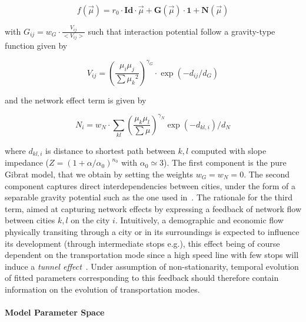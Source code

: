 \documentclass[Royal,sageh,times]{sagej}
\begin{document}
\begin{equation}
f(\vec{\mu}) = r_0\cdot \mathbf{Id}\cdot \vec{\mu} + \mathbf{G}\left(\vec{\mu}\right)\cdot \mathbf{1} + \mathbf{N}\left(\vec{\mu}\right)
\end{equation}


with $G_{ij} = w_G\cdot \frac{V_{ij}}{<V_{ij}>}$ such that interaction potential follow a gravity-type function given by 

\begin{equation}
V_{ij} = \left(\frac{\mu_i\mu_j}{\sum{\mu_k}^2}\right)^{\gamma_G}\cdot \exp{(-d_{ij}/d_G)}
\end{equation}

and the network effect term is given by


\begin{equation}
N_{i} = w_N \cdot \sum_{kl} \left(\frac{\mu_k\mu_l}{\sum\mu}\right)^{\gamma_N}\exp{(-d_{kl,i})/d_N}
\end{equation}

where $d_{kl,i}$ is distance to shortest path between $k,l$ computed with slope impedance ($Z=\left(1+\alpha/\alpha_0\right)^{n_0}$ with $\alpha_0\simeq 3$). The first component is the pure Gibrat model, that we obtain by setting the weights $w_G = w_N = 0$. The second component captures direct interdependencies between cities, under the form of a separable gravity potential such as the one used in~\cite{sanders1992systeme}. The rationale for the third term, aimed at capturing network effects by expressing a feedback of network flow between cities $k,l$ on the city $i$. Intuitively, a demographic and economic flow physically transiting through a city or in its surroundings is expected to influence its development (through intermediate stops e.g.), this effect being of course dependent on the transportation mode since a high speed line with few stops will induce a \emph{tunnel effect}~\cite{}.%
 Under assumption of non-stationarity, temporal evolution of fitted parameters corresponding to this feedback should therefore contain information on the evolution of transportation modes.




\paragraph{Model Parameter Space}
\end{document}
